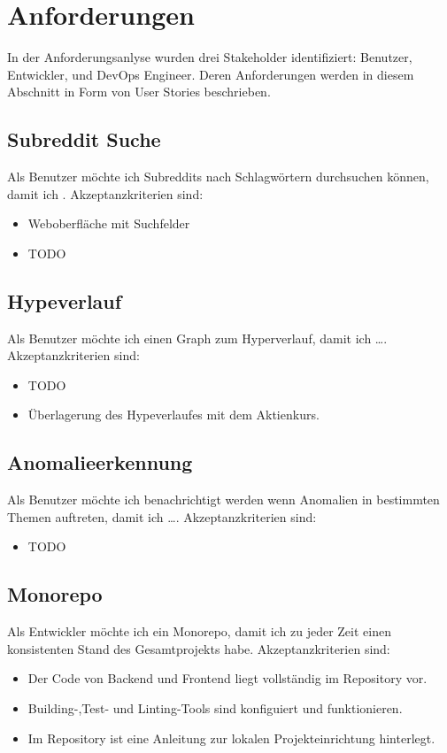 \documentclass[a4paper, 10pt, conference]{ieeeconf}
\begin{document}
\section{Anforderungen} \label{s:anforderungen}

In der Anforderungsanlyse wurden drei Stakeholder identifiziert: Benutzer, Entwickler, und DevOps Engineer.  Deren Anforderungen werden in diesem Abschnitt in Form von User Stories beschrieben. 

\subsection{Subreddit Suche}

Als Benutzer möchte ich Subreddits nach Schlagwörtern durchsuchen können,  damit ich .  Akzeptanzkriterien sind:
\begin{itemize}
\item Weboberfläche mit Suchfelder
\item TODO
\end{itemize}

\subsection{Hypeverlauf}

Als Benutzer möchte ich einen Graph zum Hyperverlauf,  damit ich \dots.  Akzeptanzkriterien sind:
\begin{itemize}
\item TODO
\item Überlagerung des Hypeverlaufes mit dem Aktienkurs.
\end{itemize}

\subsection{Anomalieerkennung}

Als Benutzer möchte ich benachrichtigt werden wenn Anomalien in bestimmten Themen auftreten,  damit ich \dots.  Akzeptanzkriterien sind:
\begin{itemize}
\item TODO
\end{itemize}

\subsection{Monorepo}

Als Entwickler möchte ich ein Monorepo, damit ich zu jeder Zeit einen konsistenten Stand des Gesamtprojekts habe.  Akzeptanzkriterien sind:
\begin{itemize}
\item Der Code von Backend und Frontend liegt vollständig im Repository vor.
\item Building-,Test- und Linting-Tools sind konfiguiert und funktionieren.
\item Im Repository ist eine Anleitung zur lokalen Projekteinrichtung hinterlegt.
\end{itemize}
\end{document}
